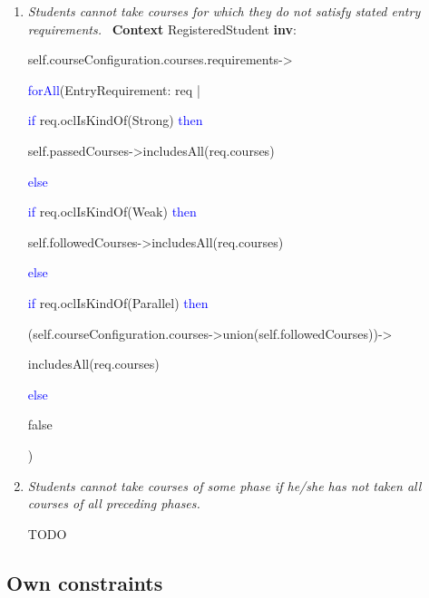 \begin{enumerate}
	\item \emph{Students cannot take courses for which they do not satisfy stated
	entry requirements.} \
	\npar \textbf{Context} RegisteredStudent \textbf{inv}:
	\par \hspace*{5 mm} self.courseConfiguration.courses.requirements->
	\par \hspace*{10 mm} \textcolor{Blue}{forAll}(EntryRequirement: req |
	\par \hspace*{15 mm} \textcolor{Blue}{if} req.oclIsKindOf(Strong)
	\textcolor{Blue}{then} \par \hspace*{20 mm}
	self.passedCourses->includesAll(req.courses) 
	\par \hspace*{15 mm} \textcolor{Blue}{else}
	\par \hspace*{20 mm} \textcolor{Blue}{if} req.oclIsKindOf(Weak)
	\textcolor{Blue}{then}
	\par \hspace*{25 mm}
	self.followedCourses->includesAll(req.courses) 
	\par \hspace*{20 mm} \textcolor{Blue}{else}
	\par \hspace*{25 mm} \textcolor{Blue}{if} req.oclIsKindOf(Parallel)
	\textcolor{Blue}{then}
	\par \hspace*{30 mm}
	(self.courseConfiguration.courses->union(self.followedCourses))->
	\par \hspace*{32 mm}includesAll(req.courses)
	\par \hspace*{25 mm} \textcolor{Blue}{else}
	\par \hspace*{30 mm} false
	\par \hspace*{5 mm} )

	\item \emph{Students cannot take courses of some phase if he/she has not taken
	all courses of all preceding phases.}
	
	\npar TODO
	
\end{enumerate}

\subsection{Own constraints}

